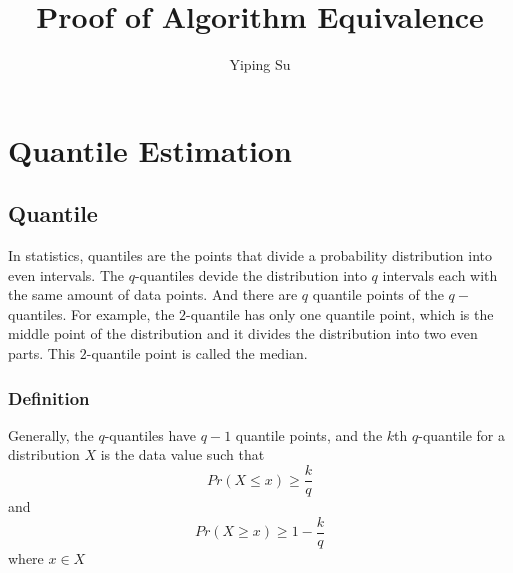 \documentclass[11pt]{article}
\title{Proof of Algorithm Equivalence}
\author{Yiping Su}
\begin{document}
\maketitle
            
\section{Quantile Estimation}

\subsection{Quantile}

In statistics, quantiles are the points that divide a probability distribution into even intervals.
The $q$-quantiles devide the distribution into $q$ intervals each with the same amount of data points.
And there are $q$ quantile points of the $q-$quantiles.
For example, the $2$-quantile has only one quantile point, which is the middle point of the distribution
and it divides the distribution into two even parts. This $2$-quantile point is called the median.


\subsubsection{Definition} \label{tau-quantile-def}
Generally, the $q$-quantiles have $q-1$ quantile points, and the $k$th $q$-quantile for a 
distribution $X$ is the data value such that
$$
Pr(X \leq x) \geq \frac{k}{q}
$$
and
$$
Pr(X \geq x) \geq 1 - \frac{k}{q}
$$
where $x \in X$
\end{document}
